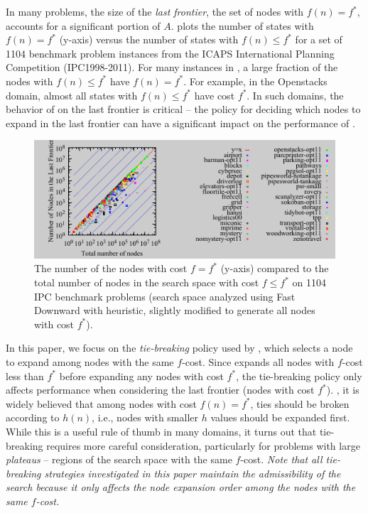 In many problems, the size of the \emph{last frontier}, the set of nodes with $f(n)=f^*$, accounts for a significant portion of $A$.
 plots the number of states with $f(n) = f^*$ (y-axis)
versus the number of states with $f(n) \leq f^*$
for a set of 1104 benchmark problem instances from the ICAPS International Planning Competition (IPC1998-2011).
For many instances in ,  a large fraction of the nodes with $f(n) \leq f^*$ have $f(n)=f^*$.
For example, in the Openstacks domain, almost all states with $f(n) \leq f^*$ have cost $f^*$.
In such domains, the behavior of \astar on the last frontier is critical -- the policy for deciding which nodes to expand in the last frontier can have a significant impact on the performance of \astar.

\begin{figure}[tb]
 \centering {} 
 \includegraphics{tables/aaai16-frontier/aaai16prelim3/lmcut_frontier_noh-front.pdf}
 \caption{
 The number of the nodes with cost $f=f^*$ (y-axis) compared to the
 total number of nodes in the search space with cost $f\leq f^*$ on 1104 IPC benchmark problems
(search space analyzed using Fast Downward with \lmcut heuristic, slightly modified to generate all nodes with cost $f^*$).}
\label{fig:plateau-noh}
\end{figure}

In this paper, we focus on the \emph{tie-breaking} policy used by
\astar, which selects a node to expand among nodes with the same
$f$-cost.  Since \astar expands all nodes with $f$-cost less than $f^*$
before expanding any nodes with cost $f^*$, the tie-breaking policy only
affects performance when considering the last frontier (nodes with cost
$f^*$).  , it is widely believed that among nodes with
cost $f(n) = f^*$, ties should be broken according to $h(n)$, i.e.,
nodes with smaller $h$ values should be expanded first.  While this is a
useful rule of thumb in many domains, it turns out that tie-breaking
requires more careful consideration, particularly for problems with
large \emph{plateaus} -- regions of the search space with the same $f$-cost.
\emph{Note that all tie-breaking strategies investigated in this paper
maintain the admissibility of the search because it only affects the node expansion
order among the nodes with the same $f$-cost.}

